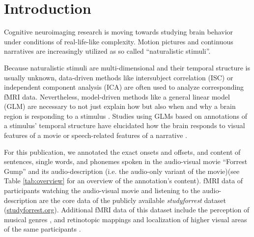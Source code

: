 \documentclass[10pt,a4paper,onecolumn]{article}
\begin{document}
\listoftodos

\clearpage

\section*{Introduction}
Cognitive neuroimaging research is moving towards studying brain behavior
under conditions of real-life-like complexity. Motion pictures \citep{hasson2008neurocinematics} and continuous narratives \citep{honey2012not, lerner2011topographic} are increasingly utilized as so called ``naturalistic stimuli''.

Because naturalistic stimuli are multi-dimensional and their temporal structure
is usually unknown, data-driven methods like intersubject correlation (ISC)\citep{hasson2004intersubject} or independent component analysis
(ICA)\citep{bartels2004chronoarchitecture} are often used to analyze
corresponding fMRI data.
Nevertheless, model-driven methods like a general linear model (GLM) are necessary to not just explain how but also when and why a brain region is responding to a stimulus \citep{hamilton2018revolution}.
Studies using GLMs based on annotations of a stimulus' temporal structure have
elucidated how the brain responds to visual features of a movie
\citep{bartels2004mapping} or speech-related features of a narrative
\citep{rocca2019language}.

For this publication, we annotated the exact onsets and offsets, and content of sentences, single words, and phonemes spoken in the audio-visual movie ``Forrest Gump'' \citep{ForrestGumpMovie} and its audio-description (i.e. the audio-only variant of the movie)\citep{ForrestGumpDVD}(see Table \ref{tab:overview} for an overview of the annotation's content).
fMRI data of participants watching the audio-visual movie \citep{hanke2016simultaneous} and listening to the audio-description \citep{hanke2014audiomovie} are the core data of the publicly available \textit{studyforrest} dataset (\href{www.studyforrest.org}{studyforrest.org}).
Additional fMRI data of this dataset include the perception of musical genres \citep{hanke2015musical}, and retinotopic mappings and localization of higher visual areas of the same participants \citep{sengupta2016extension}.
\end{document}
